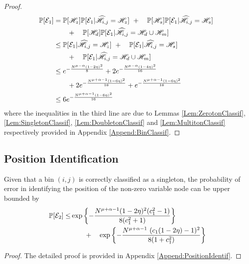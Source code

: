 \begin{proof}
\begin{align*}
\mathbb{P}[\mathcal{E}_1]&=\mathbb{P}[\mathscr{H}_z]\mathbb{P}[\mathcal{E}_1|\widehat{\mathscr{H}}_{i,j}=\mathscr{H}_z]~+
						\quad \mathbb{P}[\mathscr{H}_s]\mathbb{P}[\mathcal{E}_1|\widehat{\mathscr{H}}_{i,j}=\mathscr{H}_s]~ \\ & \qquad +
						\quad\mathbb{P}[\mathscr{H}_d]\mathbb{P}[\mathcal{E}_1|\widehat{\mathscr{H}}_{i,j}=\mathscr{H}_d \cup \mathscr{H}_m] \notag\\
				&\leq \mathbb{P}[\mathcal{E}_1|\widehat{\mathscr{H}}_{i,j}=\mathscr{H}_z]~+
						\quad \mathbb{P}[\mathcal{E}_1|\widehat{\mathscr{H}}_{i,j}=\mathscr{H}_s]~ \\
						&\qquad + \quad \mathbb{P}[\mathcal{E}_1|\widehat{\mathscr{H}}_{i,j}=\mathscr{H}_d \cup \mathscr{H}_m]\\
    			&\leq  e^{-\frac{N^{\mu-\alpha}(1-2\eta)^2}{8}}+2e^{-\frac{N^{\mu-\alpha}(1-4\eta)^2}{16}}\\ & \qquad + 2e^{-\frac{N^{\mu+\alpha-1}(1-6\eta)^2}{16}}+e^{-\frac{N^{\mu+\alpha-1}(1-6\eta)^2}{16}}\\
    			&\leq 6e^{-\frac{N^{\mu+\alpha-1}(1-6\eta)^2}{16}}\\
 \end{align*}
						where the inequalities in the third line are due to Lemmas \ref{Lem:ZerotonClassif}, \ref{Lem:SingletonClassif}, \ref{Lem:DoubletonClassif} and \ref{Lem:MultitonClassif} respectively provided in Appendix \ref{Append:BinClassif}.
\end{proof}

\subsection{\bf Position Identification}
\begin{lemma}
Given that a bin $(i,j)$ is correctly classified as a singleton, the probability of error in identifying the position of the non-zero variable node can be upper bounded by
\begin{align*}
\mathbb{P}[\mathcal{E}_2]\leq & \exp\left\lbrace-\frac{N^{\mu+\alpha-1}(1-2\eta)^2(c_1^2-1)}{8(c_1^2+1)}\right\rbrace\\
 &\qquad + \quad \exp\left\lbrace-\frac{N^{\mu+\alpha-1} ~ (c_1(1 - 2\eta) - 1)^2}{8(1+ c_1^2)}\right\rbrace
\end{align*}\label{Lem:posidentification}
\end{lemma}
\begin{proof}
	The detailed proof is provided in Appendix \ref{Append:PositionIdentif}.
\end{proof}

